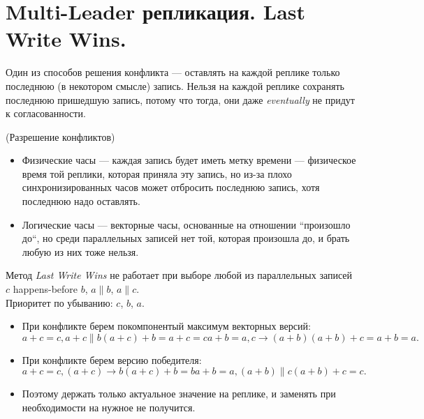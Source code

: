 \section{Multi-Leader репликация. Last Write Wins.}
    Один из способов решения конфликта --- оставлять на каждой реплике только последнюю (в некотором смысле) запись. Нельзя на каждой реплике сохранять последнюю пришедшую запись, потому что тогда, они даже \textit{eventually} не придут к согласованности.
    \begin{algorithm}(Разрешение конфликтов)
    \begin{itemize}
        \item Физические часы --- каждая запись будет иметь метку времени --- физическое время той реплики, которая приняла эту запись, но из-за плохо синхронизированных часов может отбросить последнюю запись, хотя последнюю надо оставлять.
        \item Логические часы --- векторные часы, основанные на отношении ``произошло до``, но среди параллельных записей нет той, которая произошла до, и брать любую из них тоже нельзя.
    \end{itemize}
    \end{algorithm}
      \begin{definition}
        Метод \textit{Last Write Wins} не работает при выборе любой из параллельных записей
          $c$ happens-before $b$, $a \parallel b$, $a \parallel c$. \\
          Приоритет по убыванию: $c$, $b$, $a$. \\
          \begin{itemize}
          \item При конфликте берем покомпонентый максимум векторных версий:
          \[
            a + c = c, a + c \parallel b
            (a + c) + b = a + c = c
            a + b = a, c \rightarrow (a + b)
            (a + b) + c = a + b = a
          .\]
          \item При конфликте берем версию победителя:
          \[
            a + c = c, (a + c) \rightarrow b
            (a + c) + b = b
            a + b = a, (a + b) \parallel c
            (a + b) + c = c
          .\]
         \item Поэтому держать только актуальное значение на реплике, и заменять при необходимости на нужное не получится.
        \end{itemize}
      \end{definition}

